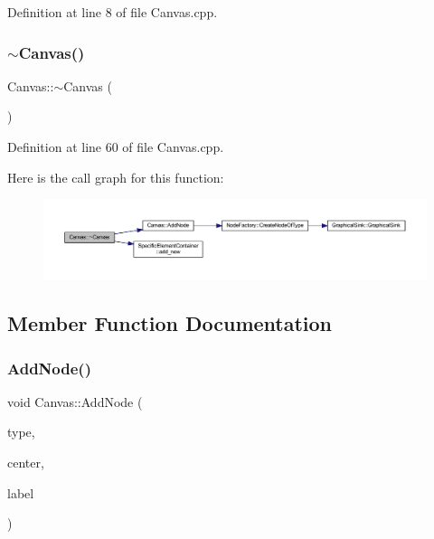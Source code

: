 Definition at line 8 of file Canvas.\+cpp.

\mbox{\label{class_canvas_a237c4549ad2e27c729cd1f71e89f0fd9}} 
\subsubsection{\texorpdfstring{$\sim$\+Canvas()}{~Canvas()}}
{\footnotesize\ttfamily Canvas\+::$\sim$\+Canvas (\begin{DoxyParamCaption}{ }\end{DoxyParamCaption})}



Definition at line 60 of file Canvas.\+cpp.

Here is the call graph for this function\+:
\nopagebreak
\begin{figure}[H]
\begin{center}
\leavevmode
\includegraphics[width=350pt]{class_canvas_a237c4549ad2e27c729cd1f71e89f0fd9_cgraph}
\end{center}
\end{figure}


\subsection{Member Function Documentation}
\mbox{\label{class_canvas_aec9038762b17b62ff6126bd6277a9cd8}} 
\subsubsection{\texorpdfstring{Add\+Node()}{AddNode()}\hspace{0.1cm}{\footnotesize\ttfamily [1/2]}}
{\footnotesize\ttfamily void Canvas\+::\+Add\+Node (\begin{DoxyParamCaption}\item[{\hyperlink{class_generic_node_a9e7985ab9bbfa1c85091adc0ab71a6b6}{Generic\+Node\+::\+Type}}]{type,  }\item[{wx\+Point2\+D\+Double}]{center,  }\item[{const std\+::string \&}]{label }\end{DoxyParamCaption})}



